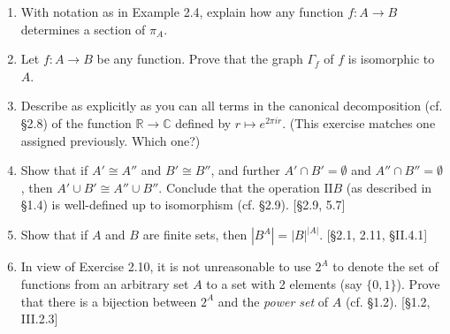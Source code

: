 \begin{enumerate}
    \item With notation as in Example 2.4, explain how any function $f: A \to B$ determines a section of $\pi_A$.

    \item Let $f: A \to B$ be any function. Prove that the graph $\Gamma_f$ of $f$ is isomorphic to $A$.

    \item Describe as explicitly as you can all terms in the canonical decomposition (cf. \S2.8) of the function $\mathbb{R} \to \mathbb{C}$ defined by $r \mapsto e^{2\pi i r}$. (This exercise matches one assigned previously. Which one?)

    \item Show that if $A' \cong A''$ and $B' \cong B''$, and further $A' \cap B' = \emptyset$ and $A'' \cap B'' = \emptyset$, then $A' \cup B' \cong A'' \cup B''$. Conclude that the operation $\text{II}B$ (as described in \S1.4) is well-defined up to isomorphism (cf. \S2.9). [\S2.9, 5.7]

    \item Show that if $A$ and $B$ are finite sets, then $|B^A| = |B|^{|A|}$. [\S2.1, 2.11, \S II.4.1]

    \item In view of Exercise 2.10, it is not unreasonable to use $2^A$ to denote the set of functions from an arbitrary set $A$ to a set with 2 elements (say $\{0,1\}$). Prove that there is a bijection between $2^A$ and the \textit{power set} of $A$ (cf. \S1.2). [\S1.2, III.2.3]

\end{enumerate}